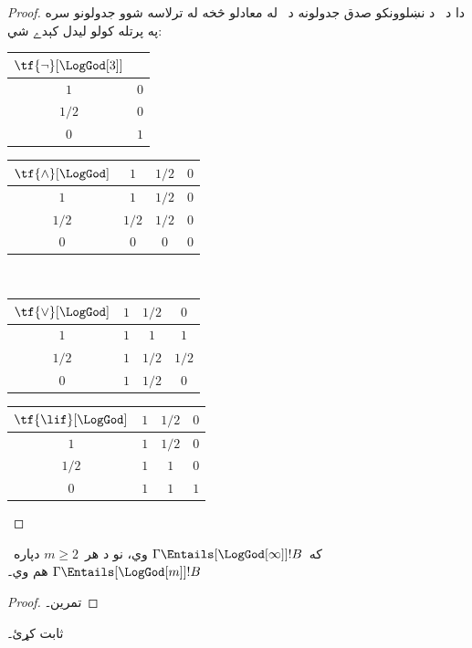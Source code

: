 \documentclass[../../../include/open-logic-section]{subfiles}
\begin{document}
\begin{proof}
  دا د~ د نښلوونکو صدق جدولونه
  د~ له معادلو څخه له ترلاسه شوو جدولونو سره
  په پرتله کولو ليدل کېدے شي:
  \begin{center}
    \begin{tabular}{c|c} 
      $\tf{\lnot}[\LogGod[3]]$ & \\ 
      \hline  
      $1$ & $0$ \\ 
      $1/2$ & $0$ \\
      $0$ & $1$ 
    \end{tabular}
    \quad
    \begin{tabular}{c|ccc} 
      $\tf{\land}[\LogGod]$ & $1$ & $1/2$ & $0$ \\ 
      \hline 
      $1$ & $1$ & $1/2$ & $0$ \\ 
      $1/2$ & $1/2$ & $1/2$ & $0$\\ 
      $0$ & $0$ & $0$ & $0$ 
    \end{tabular}
    \\[2ex]
    \begin{tabular}{c|ccc} 
      $\tf{\lor}[\LogGod]$ & $1$ & $1/2$ & $0$ \\ 
      \hline 
      $1$ & $1$ & $1$ & $1$ \\ 
      $1/2$ & $1$ & $1/2$ & $1/2$ \\
      $0$ & $1$ & $1/2$ & $0$ 
    \end{tabular}
    \quad
    \begin{tabular}{c|ccc} 
      $\tf{\lif}[\LogGod]$ & $1$ & $1/2$ & $0$ \\ 
      \hline 
      $1$ & $1$ & $1/2$ & $0$ \\ 
      $1/2$ & $1$ & $1$ & $0$  \\ 
      $0$ & $1$ & $1$ & $1$ 
    \end{tabular}
  \end{center} 
\end{proof}

\begin{prop}
  که~$\Gamma \Entails[\LogGod[\infty]] !B$ وي، نو د هر~$m \ge 2$
  دپاره~$\Gamma \Entails[\LogGod[m]] !B$ هم وي۔
\end{prop}

\begin{proof}
  تمرين۔
\end{proof}

\begin{prob}
   ثابت کړئ۔
\end{prob}
\end{document}
